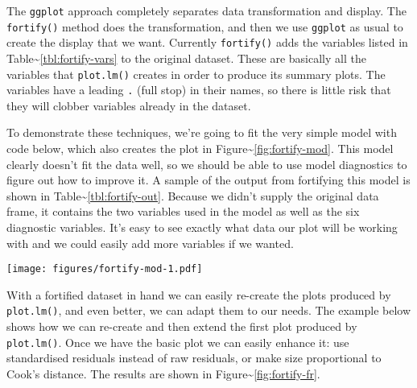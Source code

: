 The \texttt{ggplot} approach completely separates data transformation
and display. The \texttt{fortify()} method does the transformation, and
then we use \texttt{ggplot} as usual to create the display that we want.
Currently \texttt{fortify()} adds the variables listed in
Table\textasciitilde{}\ref{tbl:fortify-vars} to the original dataset.
These are basically all the variables that \texttt{plot.lm()} creates in
order to produce its summary plots. The variables have a leading
\texttt{.} (full stop) in their names, so there is little risk that they
will clobber variables already in the dataset.

To demonstrate these techniques, we're going to fit the very simple
model with code below, which also creates the plot in
Figure\textasciitilde{}\ref{fig:fortify-mod}. This model clearly doesn't
fit the data well, so we should be able to use model diagnostics to
figure out how to improve it. A sample of the output from fortifying
this model is shown in Table\textasciitilde{}\ref{tbl:fortify-out}.
Because we didn't supply the original data frame, it contains the two
variables used in the model as well as the six diagnostic variables.
It's easy to see exactly what data our plot will be working with and we
could easily add more variables if we wanted.

\begin{Shaded}
\begin{Highlighting}[]
 \StringTok{ }\NormalTok{(} \NormalTok{)}
\end{Highlighting}
\end{Shaded}

\texttt{[image: figures/fortify-mod-1.pdf]}

\begin{Shaded}
\begin{Highlighting}[]
\StringTok{ }\StringTok{ } 
\end{Highlighting}
\end{Shaded}

With a fortified dataset in hand we can easily re-create the plots
produced by \texttt{plot.lm()}, and even better, we can adapt them to
our needs. The example below shows how we can re-create and then extend
the first plot produced by \texttt{plot.lm()}. Once we have the basic
plot we can easily enhance it: use standardised residuals instead of raw
residuals, or make size proportional to Cook's distance. The results are
shown in Figure\textasciitilde{}\ref{fig:fortify-fr}.

